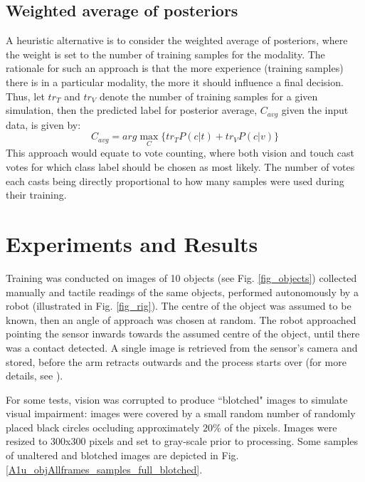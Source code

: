 \documentclass[9pt,technote]{IEEEtran}  %
\begin{document}
\subsection{Weighted average of posteriors}
A heuristic alternative is to consider the weighted average of posteriors, where the weight is set to the number of training samples for the modality. The rationale for such an approach is that the more experience (training samples) there is in a particular modality, the more it should influence a final decision. Thus, let $tr_T$ and $tr_V$ denote the number of training samples for a given simulation, then the predicted label for posterior average, $C_{avg}$ given the input data, is given by:
\begin{equation}
C_{avg} = arg\max_C \{tr_T P(c|t) + tr_V P(c|v)\}
\label{eqn_cavg}
\end{equation}
This approach would equate to vote counting, where both vision and touch cast votes for which class label should be chosen as most likely. The number of votes each casts being directly proportional to how many samples were used during their training.

\section{Experiments and Results}
Training was conducted on images of 10 objects (see Fig. \ref{fig_objects}) collected manually and tactile readings of the same objects, performed autonomously by a robot (illustrated in Fig. \ref{fig_rig}). The centre of the object was assumed to be known, then an angle of approach was chosen at random. The robot approached pointing the sensor inwards towards the assumed centre of the object, until there was a contact detected. A single image is retrieved from the sensor's camera and stored, before the arm retracts outwards and the process starts over (for more details, see \cite{Corradi2015}). 

\begin{figure}
	\centering
\end{figure}

For some tests, vision was corrupted to produce ``blotched" images to simulate visual impairment: images were covered by a small random number of randomly placed black circles occluding approximately $20\%$ of the pixels. Images were resized to 300x300 pixels and set to gray-scale prior to processing. Some samples of unaltered and blotched images are depicted in Fig. \ref{A1u_objAllframes_samples_full_blotched}.
\end{document}
